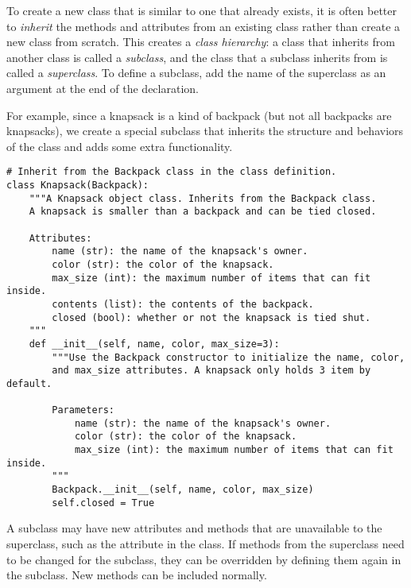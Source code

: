To create a new class that is similar to one that already exists, it is often better to \emph{inherit} the methods and attributes from an existing class rather than create a new class from scratch.
This creates a \emph{class hierarchy}: a class that inherits from another class is called a \emph{subclass}, and the class that a subclass inherits from is called a \emph{superclass}.
To define a subclass, add the name of the superclass as an argument at the end of the  declaration.

For example, since a knapsack is a kind of backpack (but not all backpacks are knapsacks), we create a special  subclass that inherits the structure and behaviors of the  class and adds some extra functionality.

\begin{lstlisting}
# Inherit from the Backpack class in the class definition.
class Knapsack(Backpack):
    """A Knapsack object class. Inherits from the Backpack class.
    A knapsack is smaller than a backpack and can be tied closed.

    Attributes:
        name (str): the name of the knapsack's owner.
        color (str): the color of the knapsack.
        max_size (int): the maximum number of items that can fit inside.
        contents (list): the contents of the backpack.
        closed (bool): whether or not the knapsack is tied shut.
    """
    def __init__(self, name, color, max_size=3):
        """Use the Backpack constructor to initialize the name, color,
        and max_size attributes. A knapsack only holds 3 item by default.

        Parameters:
            name (str): the name of the knapsack's owner.
            color (str): the color of the knapsack.
            max_size (int): the maximum number of items that can fit inside.
        """
        Backpack.__init__(self, name, color, max_size)
        self.closed = True
\end{lstlisting}

A subclass may have new attributes and methods that are unavailable to the superclass, such as the  attribute in the  class.
If methods from the superclass need to be changed for the subclass, they can be overridden by defining them again in the subclass.
New methods can be included normally.


